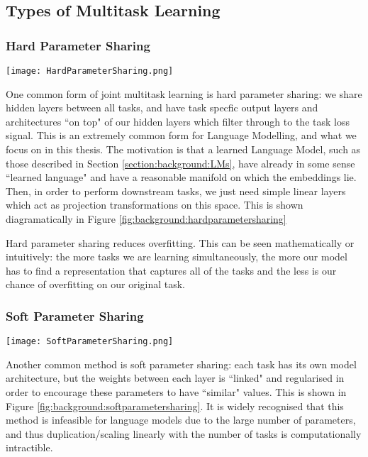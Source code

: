 {{\subsection{Types of Multitask Learning}
\subsubsection{Hard Parameter Sharing}
\begin{center}
	\texttt{[image: HardParameterSharing.png]}
	\label{fig:background:hardparametersharing}
\end{center}

One common form of joint multitask learning is hard parameter sharing: we share hidden layers between all tasks, and have task specfic output layers and architectures ``on top" of our hidden layers which filter through to the task loss signal. This is an extremely common form for Language Modelling, and what we focus on in this thesis. The motivation is that a learned Language Model, such as those described in Section \ref{section:background:LMs}, have already in some sense ``learned language" and have a reasonable manifold on which the embeddings lie. Then, in order to perform downstream tasks, we just need simple linear layers which act as projection transformations on this space. This is shown diagramatically in Figure \ref{fig:background:hardparametersharing}

Hard parameter sharing reduces overfitting. This can be seen mathematically \cite{Baxter1997} or intuitively: the more tasks we are learning simultaneously, the more our model has to find a representation that captures all of the tasks and the less is our chance of overfitting on our original task.

\subsubsection{Soft Parameter Sharing} \label{section:background:softparametersharing}
\begin{center}
	\texttt{[image: SoftParameterSharing.png]}
	\label{fig:background:softparametersharing}
\end{center}

Another common method is soft parameter sharing: each task has its own model architecture, but the weights between each layer is ``linked" and regularised in order to encourage these parameters to have ``similar" values. This is shown in Figure \ref{fig:background:softparametersharing}. It is widely recognised that this method is infeasible for language models due to the large number of parameters, and thus duplication/scaling linearly with the number of tasks is computationally intractible.

}}

